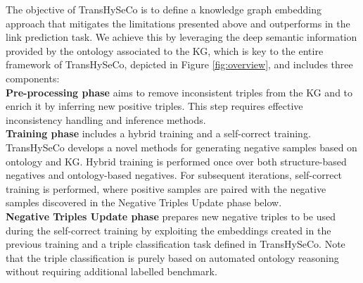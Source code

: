 \documentclass[sigconf]{acmart}
\newcommand{\TransHI}{TransHySeCo\xspace}
\begin{document}
The objective of  \TransHI is to define a knowledge graph embedding approach that mitigates the limitations presented above and outperforms in the link prediction task. We achieve this by leveraging the deep semantic information provided by the ontology associated to the KG, which is  key to the entire framework of  \TransHI, depicted in Figure \ref{fig:overview}, and includes three components:\\
\textbf{Pre-processing phase} aims to remove inconsistent triples from the KG  and to  enrich it by inferring new positive triples. This step requires effective inconsistency handling and inference methods.\\ 
     \textbf{Training phase} includes a hybrid training and a self-correct training. \TransHI develops a novel methods for generating negative samples based on ontology and KG.  Hybrid training is performed once over both structure-based negatives and ontology-based negatives. 
     For   subsequent iterations, self-correct training is performed, where positive samples are paired with the negative samples discovered in the Negative Triples Update 
     phase below.\\
     \textbf{Negative Triples Update phase} prepares new negative triples to be used during the self-correct training by exploiting the embeddings created in the previous training and a triple classification task defined in \TransHI. Note that the triple classification is  purely based on automated ontology  reasoning without requiring additional labelled benchmark. 


\end{document}

